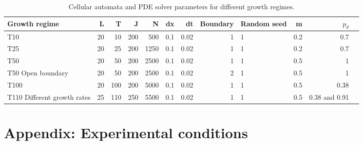 \begin{table}[H]
    \centering
    \begin{adjustbox}{center}

        \begin{tabular}{lrrrrrrrlrrl}
        \toprule
        \textbf{Growth regime} & \textbf{L} & \textbf{T} & \textbf{J} & \textbf{N} & \textbf{dx} & \textbf{dt} & \textbf{Boundary}  & \textbf{Random seed} & \textbf{m} & \textbf{$p_{d}$} \\
        \midrule
        T10 & 20 & 10 & 200 & 500 & 0.1 & 0.02 & 1  & 1 & 0.2 & 0.7 \\
        T25 & 20 & 25 & 200 & 1250 & 0.1 & 0.02 & 1  & 1 & 0.2 & 0.7 \\
        T50 & 20 & 50 & 200 & 2500 & 0.1 & 0.02 & 1  & 1 & 0.5 & 1 \\
        T50 Open boundary & 20 & 50 & 200 & 2500 & 0.1 & 0.02 & 2  & 1 & 0.5 & 1 \\
        T100 & 20 & 100 & 200 & 5000 & 0.1 & 0.02 & 1  & 1 & 0.5 & 0.38 \\
        T110 Different growth rates & 25 & 110 & 250 & 5500 & 0.1 & 0.02 & 1 & 1 & 0.5 & 0.38 and 0.91 \\
        \bottomrule
    \end{tabular}
        \end{adjustbox}

    \caption{Cellular automata and PDE solver parameters for different growth regimes.}
    \label{tab:numerical_param_table}
\end{table}

\chapter{Appendix: Experimental conditions}


